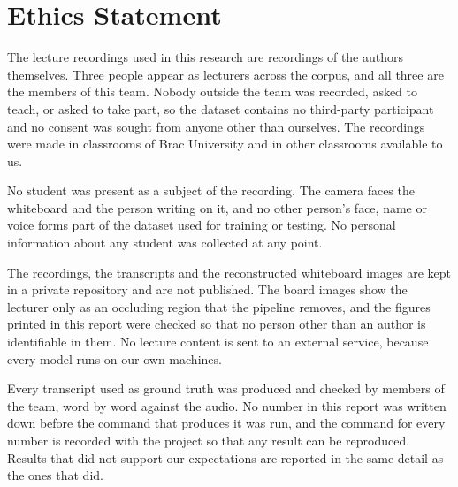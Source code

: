 \section*{Ethics Statement}

The lecture recordings used in this research are recordings of the authors themselves.
Three people appear as lecturers across the corpus, and all three are the members of
this team. Nobody outside the team was recorded, asked to teach, or asked to take part,
so the dataset contains no third-party participant and no consent was sought from anyone
other than ourselves. The recordings were made in classrooms of Brac University and in
other classrooms available to us.

No student was present as a subject of the recording. The camera faces the whiteboard
and the person writing on it, and no other person's face, name or voice forms part of
the dataset used for training or testing. No personal information about any student was
collected at any point.

The recordings, the transcripts and the reconstructed whiteboard images are kept in a
private repository and are not published. The board images show the lecturer only as an
occluding region that the pipeline removes, and the figures printed in this report were
checked so that no person other than an author is identifiable in them. No lecture
content is sent to an external service, because every model runs on our own machines.

Every transcript used as ground truth was produced and checked by members of the team,
word by word against the audio. No number in this report was written down before the
command that produces it was run, and the command for every number is recorded with the
project so that any result can be reproduced. Results that did not support our
expectations are reported in the same detail as the ones that did.


\pagebreak
